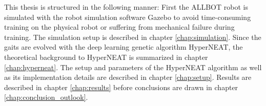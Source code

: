 This thesis is structured in the following manner:
First the ALLBOT robot is simulated with the robot simulation software Gazebo to avoid time-consuming training on the physical 
robot or suffering from mechanical failure during training. The simulation setup is described in chapter \ref{chap:simulation}.
Since the gaits are evolved with the deep learning genetic algorithm HyperNEAT, the theoretical background to HyperNEAT is summarized in chapter \ref{chap:hyperneat}.
The setup and parameters of the HyperNEAT algorithm as well as its implementation details are described in chapter \ref{chap:setup}.
Results are described in chapter \ref{chap:results} before conclusions are drawn in chapter \ref{chap:conclusion_outlook}.
